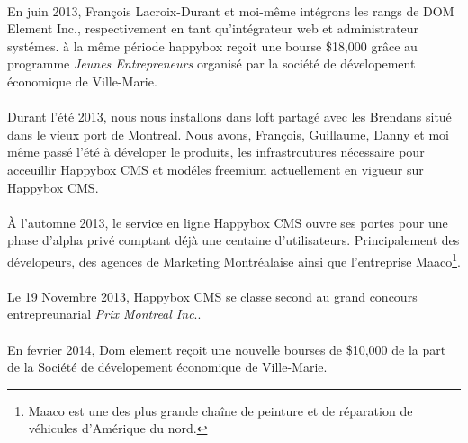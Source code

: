 \documentclass[11pt, a4paper ]{article}
\begin{document}
\begin{spacing}{1.5}

\paragraph{}
En juin 2013, François Lacroix-Durant et moi-même intégrons les rangs de DOM Element Inc., respectivement en tant qu'intégrateur web et administrateur systémes. à la même période happybox reçoit une bourse \$18,000 grâce au programme \emph{Jeunes Entrepreneurs} organisé par la société de dévelopement économique de Ville-Marie.

\paragraph{} %
Durant l'été 2013, nous nous installons dans loft partagé avec les Brendans situé dans le vieux port de Montreal. Nous avons, François, Guillaume, Danny et moi même passé l'été à déveloper le produits, les infrastrcutures nécessaire pour acceuillir Happybox CMS et modéles freemium actuellement en vigueur sur Happybox CMS.


\paragraph{}
À l'automne 2013, le service en ligne Happybox CMS ouvre ses portes pour une phase d'alpha privé comptant déjà une centaine d'utilisateurs. Principalement des dévelopeurs, des agences de Marketing Montréalaise ainsi que l'entreprise Maaco\footnote{Maaco est une des plus grande chaîne de peinture et de réparation de véhicules d'Amérique du nord.}.

\paragraph{}
Le 19 Novembre 2013, Happybox CMS se classe second au grand concours entrepreunarial \emph{Prix Montreal Inc}..

\paragraph{}
En fevrier 2014, Dom element reçoit une nouvelle bourses de \$10,000 de la part de la Société de dévelopement économique de Ville-Marie.


\end{spacing}
\end{document}
